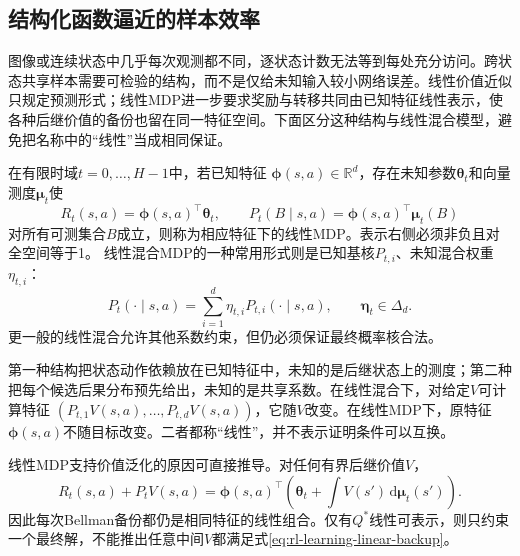 \subsection{结构化函数逼近的样本效率}
\label{sec:rl-learning-linear-complexity}

图像或连续状态中几乎每次观测都不同，逐状态计数无法等到每处充分访问。跨状态共享样本需要可检验的结构，而不是仅给未知输入较小网络误差。线性价值近似只规定预测形式；线性MDP进一步要求奖励与转移共同由已知特征线性表示，使各种后继价值的备份也留在同一特征空间。下面区分这种结构与线性混合模型，避免把名称中的“线性”当成相同保证。

\begin{definition}[线性MDP与线性混合MDP]
  \label{def:rl-learning-linear-mdp}
  在有限时域$t=0,\ldots,H-1$中，若已知特征
  $\bm\phi(s,a)\in\mathbb R^d$，存在未知参数$\bm\theta_t$和向量测度$\bm\mu_t$使
  \[
    R_t(s,a)=\bm\phi(s,a)^\top\bm\theta_t,\qquad
    P_t(B\mid s,a)=\bm\phi(s,a)^\top\bm\mu_t(B)
  \]
  对所有可测集合$B$成立，则称为相应特征下的线性MDP。表示右侧必须非负且对全空间等于1。
  线性混合MDP的一种常用形式则是已知基核$P_{t,i}$、未知混合权重$\eta_{t,i}$：
  \[
    P_t(\cdot\mid s,a)=\sum_{i=1}^d\eta_{t,i}P_{t,i}(\cdot\mid s,a),
       \qquad \bm\eta_t\in\Delta_d.
  \]
  更一般的线性混合允许其他系数约束，但仍必须保证最终概率核合法。
\end{definition}

第一种结构把状态动作依赖放在已知特征中，未知的是后继状态上的测度；第二种把每个候选后果分布预先给出，未知的是共享系数。在线性混合下，对给定$V$可计算特征
$(P_{t,1}V(s,a),\ldots,P_{t,d}V(s,a))$，它随$V$改变。在线性MDP下，原特征$\bm\phi(s,a)$不随目标改变。二者都称“线性”，并不表示证明条件可以互换。

线性MDP支持价值泛化的原因可直接推导。对任何有界后继价值$V$，
\begin{equation}
 R_t(s,a)+P_tV(s,a)
   =\bm\phi(s,a)^\top
       \left(\bm\theta_t+\int V(s')\,\mathrm d\bm\mu_t(s')\right).
 \label{eq:rl-learning-linear-backup}
\end{equation}
因此每次Bellman备份都仍是相同特征的线性组合。仅有$Q^*$线性可表示，则只约束一个最终解，不能推出任意中间$V$都满足式\eqref{eq:rl-learning-linear-backup}。

